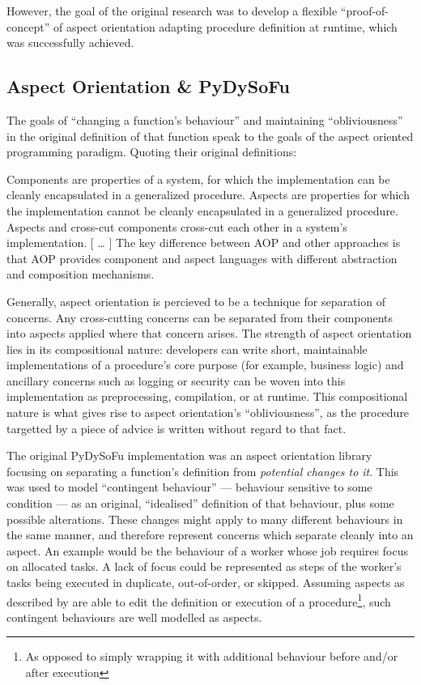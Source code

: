 However, the goal of the original research was to develop a flexible
``proof-of-concept'' of aspect orientation adapting procedure definition at
runtime, which was successfully
achieved\cite{wallis2018caise,wallis2018genetic}. 

\subsection{Aspect Orientation \& PyDySoFu}\label{subsec:pdsf_aop}

The goals of ``changing a function's behaviour'' and maintaining
``obliviousness'' in the original definition of that function speak to the goals
of the aspect oriented programming paradigm\cite{kiczales1997aspect}. Quoting
their original definitions:

\begin{displayquote}
    Components are properties of a system, for which the implementation can be
    cleanly encapsulated in a generalized procedure. Aspects are properties
    for which the implementation cannot be cleanly encapsulated in a
    generalized procedure. Aspects and cross-cut components cross-cut each other
    in a system’s implementation.
    [ \ldots{} ]
    The key difference between
    AOP and other approaches is that AOP provides component and aspect languages
    with different abstraction and composition mechanisms.
\end{displayquote}

Generally, aspect orientation is percieved to be a technique for separation of
concerns. Any cross-cutting concerns can be separated from their components into
aspects applied where that concern arises. The strength of aspect orientation
lies in its compositional nature: developers can write short, maintainable
implementations of a procedure's core purpose (for example, business logic) and
ancillary concerns such as logging or security can be woven into this
implementation as preprocessing, compilation, or at runtime. This compositional
nature is what gives rise to aspect orientation's ``obliviousness'', as the
procedure targetted by a piece of advice is written without regard to that fact.

The original PyDySoFu implementation was an aspect orientation library focusing
on separating a function's definition from \emph{potential changes to it}. This
was used to model ``contingent behaviour'' --- behaviour sensitive to some
condition --- as an original, ``idealised'' definition of that behaviour, plus
some possible alterations. These changes might apply to many different
behaviours in the same manner, and therefore represent concerns which separate
cleanly into an aspect. An example would be the behaviour of a worker whose job
requires focus on allocated tasks. A lack of focus could be represented as steps
of the worker's tasks being executed in duplicate, out-of-order, or skipped.
Assuming aspects as described by \citeauthor{kiczales1997aspect} are able to
edit the definition or execution of a procedure\footnote{As opposed to simply
wrapping it with additional behaviour before and/or after execution}, such
contingent behaviours are well modelled as aspects.

